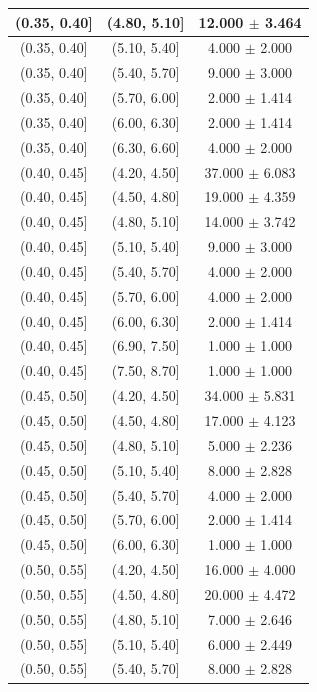 \begin{longtable}{|c|c|c|}
\hline
(0.35, 0.40] & (4.80, 5.10] & 12.000 $\pm$ 3.464 \\ 
\hline
(0.35, 0.40] & (5.10, 5.40] & 4.000 $\pm$ 2.000 \\ 
\hline
(0.35, 0.40] & (5.40, 5.70] & 9.000 $\pm$ 3.000 \\ 
\hline
(0.35, 0.40] & (5.70, 6.00] & 2.000 $\pm$ 1.414 \\ 
\hline
(0.35, 0.40] & (6.00, 6.30] & 2.000 $\pm$ 1.414 \\ 
\hline
(0.35, 0.40] & (6.30, 6.60] & 4.000 $\pm$ 2.000 \\ 
\hline
(0.40, 0.45] & (4.20, 4.50] & 37.000 $\pm$ 6.083 \\ 
\hline
(0.40, 0.45] & (4.50, 4.80] & 19.000 $\pm$ 4.359 \\ 
\hline
(0.40, 0.45] & (4.80, 5.10] & 14.000 $\pm$ 3.742 \\ 
\hline
(0.40, 0.45] & (5.10, 5.40] & 9.000 $\pm$ 3.000 \\ 
\hline
(0.40, 0.45] & (5.40, 5.70] & 4.000 $\pm$ 2.000 \\ 
\hline
(0.40, 0.45] & (5.70, 6.00] & 4.000 $\pm$ 2.000 \\ 
\hline
(0.40, 0.45] & (6.00, 6.30] & 2.000 $\pm$ 1.414 \\ 
\hline
(0.40, 0.45] & (6.90, 7.50] & 1.000 $\pm$ 1.000 \\ 
\hline
(0.40, 0.45] & (7.50, 8.70] & 1.000 $\pm$ 1.000 \\ 
\hline
(0.45, 0.50] & (4.20, 4.50] & 34.000 $\pm$ 5.831 \\ 
\hline
(0.45, 0.50] & (4.50, 4.80] & 17.000 $\pm$ 4.123 \\ 
\hline
(0.45, 0.50] & (4.80, 5.10] & 5.000 $\pm$ 2.236 \\ 
\hline
(0.45, 0.50] & (5.10, 5.40] & 8.000 $\pm$ 2.828 \\ 
\hline
(0.45, 0.50] & (5.40, 5.70] & 4.000 $\pm$ 2.000 \\ 
\hline
(0.45, 0.50] & (5.70, 6.00] & 2.000 $\pm$ 1.414 \\ 
\hline
(0.45, 0.50] & (6.00, 6.30] & 1.000 $\pm$ 1.000 \\ 
\hline
(0.50, 0.55] & (4.20, 4.50] & 16.000 $\pm$ 4.000 \\ 
\hline
(0.50, 0.55] & (4.50, 4.80] & 20.000 $\pm$ 4.472 \\ 
\hline
(0.50, 0.55] & (4.80, 5.10] & 7.000 $\pm$ 2.646 \\ 
\hline
(0.50, 0.55] & (5.10, 5.40] & 6.000 $\pm$ 2.449 \\ 
\hline
(0.50, 0.55] & (5.40, 5.70] & 8.000 $\pm$ 2.828 \\ 

\end{longtable}
